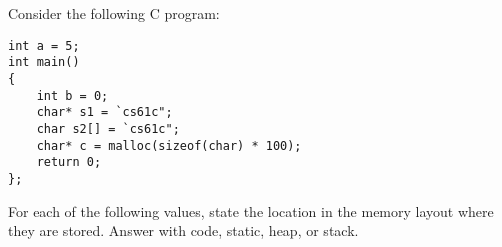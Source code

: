 \begin{blocksection}
\question
Consider the following C program:

\begin{verbatim}
int a = 5;
int main()
{
    int b = 0;
    char* s1 = `cs61c";
    char s2[] = `cs61c";
    char* c = malloc(sizeof(char) * 100);
    return 0;
};
\end{verbatim}

For each of the following values, state the location in the memory layout where they are stored. Answer with code, static, heap, or stack.

\end{blocksection}